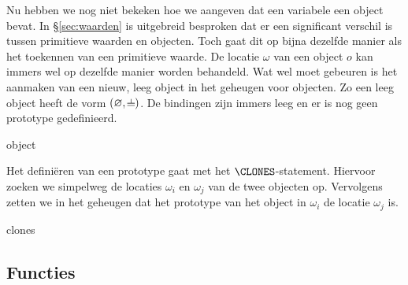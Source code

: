 Nu hebben we nog niet bekeken hoe we aangeven dat een variabele een object bevat. In §\ref{sec:waarden} is uitgebreid besproken dat er een significant verschil is tussen primitieve waarden en objecten. Toch gaat dit op bijna dezelfde manier als het toekennen van een primitieve waarde. De locatie $\omega$ van een object $o$ kan immers wel op dezelfde manier worden behandeld. Wat wel moet gebeuren is het aanmaken van een nieuw, leeg object in het geheugen voor objecten. Zo een leeg object heeft de vorm $(\varnothing, \nil)$. De bindingen zijn immers leeg en er is nog geen prototype gedefinieerd.

\begin{NSAxiom}{object}
  \begin{prooftree}
  \end{prooftree}
  \begin{NSConditions}
    \Cond{$ \omega = \Nexto(\mo) $}
  \end{NSConditions}
\end{NSAxiom}

Het definiëren van een prototype gaat met het $\CLONES$-statement. Hiervoor zoeken we simpelweg de locaties $\omega_i$ en $\omega_j$ van de twee objecten op. Vervolgens zetten we in het geheugen dat het prototype van het object in $\omega_i$ de locatie $\omega_j$ is.

\begin{NSAxiom}{clones}
  \begin{prooftree}
  \end{prooftree}
  \begin{NSConditions}
  \end{NSConditions}
\end{NSAxiom}

\subsection{Functies}


